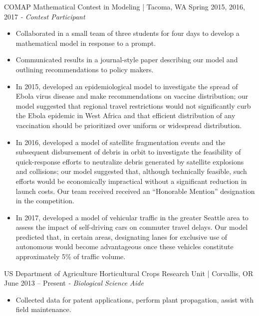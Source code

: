 COMAP Mathematical Contest in Modeling | Tacoma, WA \hfill Spring 2015, 2016, 2017 \newline 
\textit{- Contest Participant} \\
  \vspace{-4.5mm}
 \begin{itemize}
 \item Collaborated in a small team of three students for four days to develop a mathematical model in response to a prompt.
 \item Communicated results in a journal-style paper describing our model and outlining recommendations to policy makers.
 \item In 2015, developed an epidemiological model to investigate the spread of Ebola virus disease and make recommendations on vaccine distribution; our model suggested that regional travel restrictions would not significantly curb the Ebola epidemic in West Africa and that efficient distribution of any vaccination should be prioritized over uniform or widespread distribution. 
 \item In 2016, developed a model of satellite fragmentation events and the subsequent disbursement of debris in orbit to investigate the feasibility of quick-response efforts to neutralize debris generated by satellite explosions and collisions; our model suggested that, although technically feasible, such efforts would be economically impractical without a significant reduction in launch costs. Our team received received an ``Honorable Mention'' designation in the competition.
 \item In 2017, developed a model of vehicular traffic in the greater Seattle area to assess the impact of self-driving cars on commuter travel delays. Our model predicted that, in certain areas, designating lanes for exclusive use of autonomous would become advantageous once these vehicles constitute approximately 5\% of traffic volume.
 \end{itemize}
  \vspace{-3.5mm}

US Department of Agriculture Horticultural Crops Research Unit | Corvallis, OR  \hfill  June 2013 – Present \newline
\textit{- Biological Science Aide}\\
  \vspace{-4.5mm}
 \begin{itemize}
 \item Collected data for patent applications, perform plant propagation, assist with field maintenance.
 \end{itemize}
  \vspace{-3.5mm}
 
